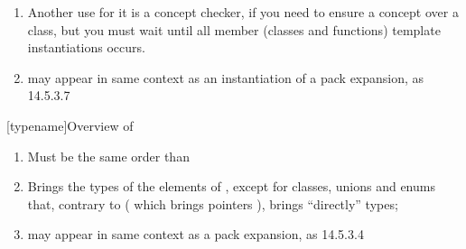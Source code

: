 \begin{enumerate}
\item Another use for it is a concept checker, if you need to ensure a concept over a class, but you must wait until all member (classes and functions) template instantiations occurs.
\item {} may appear in same context as an instantiation of a pack expansion, as 14.5.3.7 \cite[N4296]{N4296}
\end{enumerate}

[typename]{Overview of }
\begin{enumerate}
\item Must be the same order than 
\item Brings the types of the elements of , except for classes, unions and enums that, contrary to  ( which brings pointers ),  brings ``directly'' types;
\item {} may appear in same context as a pack expansion, as 14.5.3.4 \cite[N4296]{N4296}
\end{enumerate}

